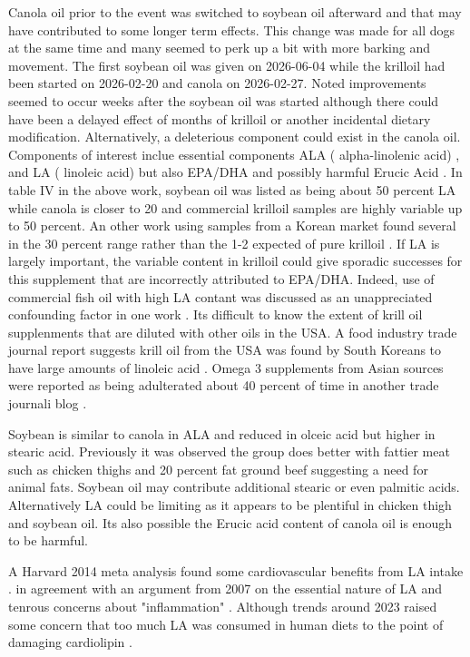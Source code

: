Canola oil prior to the event was switched to soybean oil
afterward and that may have contributed to some
longer term effects. 
This change was made for all dogs at the same time and many
seemed to perk up a bit with more barking and movement.
The first soybean oil was given on 2026-06-04 while the krilloil
had been started on 2026-02-20 and canola on 2026-02-27.
Noted improvements seemed to occur weeks after the soybean oil
was started although there could have been a delayed effect
of months of krilloil or another incidental dietary modification.
Alternatively, a deleterious component could exist in the canola
oil.  
Components of interest inclue essential components  ALA ( alpha-linolenic acid)
, and LA ( linoleic acid) but also 
 EPA/DHA and possibly harmful  Erucic Acid \cite{marchywka-MJM-2025-004-0.50}.
In table IV in the above work, soybean oil was listed
as being about 50 percent LA while canola is closer to 20
and commercial krilloil samples are  highly variable up to 50 percent.
An other work using samples from a Korean market found several
in the 30 percent range rather than the 1-2 expected of pure
krilloil  \cite{PMC11540601}.
If LA is largely important, the variable content in krilloil could
give sporadic successes for this supplement that are incorrectly
attributed to EPA/DHA. Indeed, use of commercial fish oil with
high LA contant was discussed as an unappreciated confounding
factor in one work  
\cite{Nichols_Kitessa_Abeywardena_Commentary_trial_2014}.
Its difficult to know the extent of krill oil supplenments that
are diluted with other oils in the USA. 
A food industry trade journal report suggests krill oil from the
USA was found by South Koreans to have large amounts of linoleic acid 
\cite{Koe_Krill_test_failures_2022}.
Omega 3 supplements from Asian sources were reported as being adulterated
about 40 percent of time in another trade journali blog 
\cite{Anopa_Anopa_Anopa_textperiodcentered_Source_}.

Soybean is similar to canola in ALA and reduced in
olceic acid but higher in stearic acid. Previously
it was observed the group does better with fattier
meat such as chicken thighs and 20 percent fat ground beef
suggesting a need for animal fats. Soybean oil may
contribute additional stearic or even palmitic acids.
Alternatively LA could be limiting as it appears to be
plentiful in chicken thigh and soybean oil. Its also possible
the Erucic acid content of canola oil is enough to be harmful.

A Harvard 2014 meta analysis found some cardiovascular benefits
from LA intake 
\cite{Farvid_Ding_Pan_Dietary_linoleic_acid_2014}.
in agreement with an argument from 2007 on the essential nature
of LA and tenrous concerns about "inflammation" 
\cite{PMID17876199}.
Although trends around 2023 raised some concern that too much
LA was consumed in human diets to the point of damaging cardiolipin
\cite{PMC10386285}.


